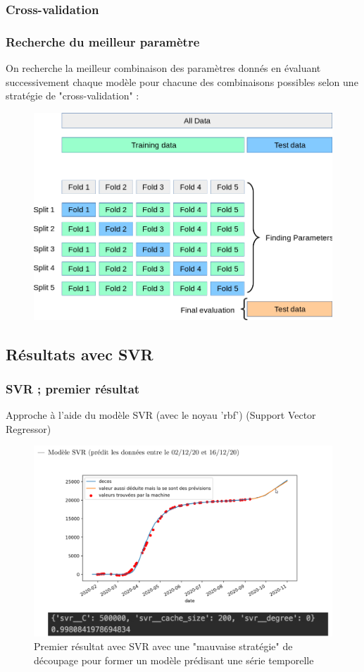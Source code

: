 \documentclass{beamer}
\begin{document}
\subsubsection{Cross-validation}
\begin{frame}
	\frametitle{Recherche du meilleur paramètre}
	On recherche la meilleur combinaison des paramètres donnés en évaluant successivement chaque modèle pour chacune des combinaisons possibles selon une stratégie de "cross-validation" :
	\begin{figure}[b]
		\centering
		\includegraphics[scale=0.2]{gscv}
	\end{figure}
\end{frame}

\subsection{Résultats avec SVR}
\begin{frame}
	\frametitle{SVR ; premier résultat}
	Approche à l'aide du modèle SVR (avec le noyau 'rbf') (Support Vector Regressor)
	\begin{figure}[tc]
		\includegraphics[scale=0.2]{SVR_premierdecoup}
		\centering
		\caption{Premier résultat avec SVR avec une "mauvaise stratégie" de découpage pour former un modèle prédisant une série temporelle}
	\end{figure}
\end{frame}
\end{document}
